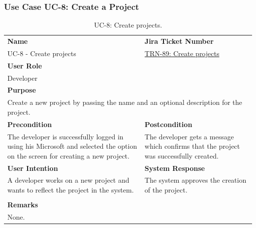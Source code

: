 \subsubsection{Use Case UC-8: Create a Project}\label{subsubsec:use-case-uc-8:-create a project}

\begin{table}[H]
    \centering
    \begin{tabular}{|p{}|p{}|}

        \hline
        \rowcolor{gray!50}\textbf{Name} & \rowcolor{gray!50}\textbf{Jira Ticket Number} \\
        UC-8 - Create projects
        &
        \href{https://fh-burgenland.atlassian.net/browse/TRN-89}{TRN-89: Create projects} \\ \hline

        \multicolumn{2}{|l|}{\rowcolor{gray!50}\textbf{User Role}} \\
        \multicolumn{2}{|l|}{Developer} \\ \hline

        \multicolumn{2}{|l|}{\rowcolor{gray!50}\textbf{Purpose}} \\
        \multicolumn{2}{|p{1\textwidth}|}{Create a new project by passing the name and an optional description for the project.} \\ \hline

        \rowcolor{gray!50}\textbf{Precondition} & \rowcolor{gray!50}\textbf{Postcondition} \\
        The developer is successfully logged in using his Microsoft and selected the option on the screen for creating a new project.
        &
        The developer gets a message which confirms that the project was successfully created.\\ \hline

        \rowcolor{gray!50}\textbf{User Intention} & \rowcolor{gray!50}\textbf{System Response} \\
        A developer works on a new project and wants to reflect the project in the system.
        &
        The system approves the creation of the project. \\ \hline

        & \\ \hline

        \multicolumn{2}{|l|}{\rowcolor{gray!50}\textbf{Remarks}} \\
        \multicolumn{2}{|p{1\textwidth}|}{None.} \\ \hline
    \end{tabular}
    \caption{UC-8: Create projects.}
    \label{tab:uc-create-project}
\end{table}

